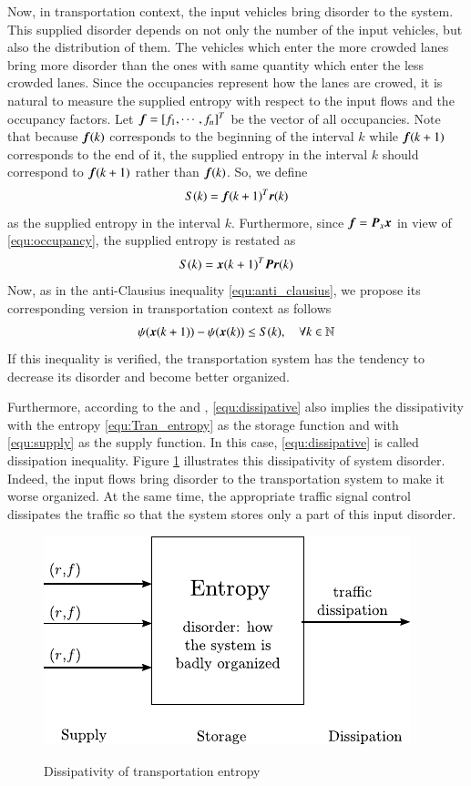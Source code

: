 \documentclass[preprint,authoryear,12pt]{elsarticle}
\renewcommand{\vec}[1]{\mbox{\boldmath$#1$}}
\newcommand{\mat}[1]{\mbox{\boldmath$#1$}}
\begin{document}
Now, in transportation context, the input vehicles bring disorder to the system. This supplied disorder depends on not only the number of the input vehicles, but also the distribution of them. The vehicles which enter the more crowded lanes bring more disorder than the ones with same quantity which enter the less crowded lanes. Since the occupancies represent how the lanes are crowed, it is natural to measure the supplied entropy with respect to the input flows and the occupancy factors. Let $\vec{f}=[f_1,\cdots,f_n]^T$ be the vector of all occupancies. Note that because $\vec{f}(k)$ corresponds to the beginning of the interval $k$ while $\vec{f}(k+1)$ corresponds to the end of it, the supplied entropy in the interval $k$ should correspond to $\vec{f}(k+1)$ rather than $\vec{f}(k)$. So, we define
$$S(k)=\vec{f}(k+1)^T\vec{r}(k)$$
as the supplied entropy in the interval $k$. Furthermore, since $\vec{f}=\mat{P}_x\vec{x}$ in view of \eqref{equ:occupancy}, the supplied entropy is restated as
\begin{equation}\label{equ:supply}
    S(k)=\vec{x}(k+1)^T \mat{P} \vec{r}(k)
\end{equation}
Now, as in the anti-Clausius inequality \eqref{equ:anti_clausius}, we propose its corresponding version in transportation context as follows
\begin{equation}\label{equ:dissipative}
\psi(\vec{x}(k+1))-\psi(\vec{x}(k)) \leq S(k),\quad \forall
k\in\mathbb{N}
\end{equation}
If this inequality is verified, the transportation system has the tendency to decrease its disorder and become better organized.

Furthermore, according to the \citet{willems_dissipative_1972} and \citet{hill_dissipative_1980}, \eqref{equ:dissipative} also implies the dissipativity with the entropy \eqref{equ:Tran_entropy} as the storage function and with \eqref{equ:supply} as the supply function. In this case, \eqref{equ:dissipative} is called dissipation inequality. Figure \ref{fig:trans_dis} illustrates this dissipativity of system disorder. Indeed, the input flows bring disorder to the transportation system to make it worse organized. At the same time, the appropriate traffic signal control dissipates the traffic so that the system stores only a part of this input disorder.
\begin{figure}[ht]
  \centering
  \includegraphics{pics/trans_dis}\\
  \caption{Dissipativity of transportation entropy}
  \label{fig:trans_dis}
\end{figure}
\end{document}
